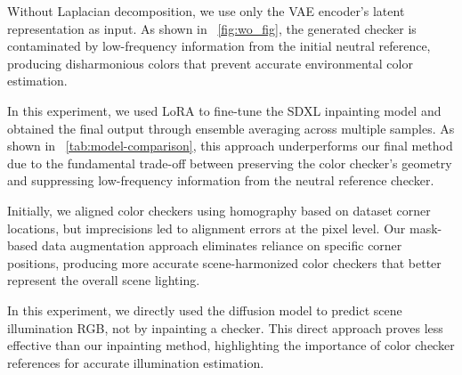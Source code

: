 






% 

\vspace{3pt}  
Without Laplacian decomposition, we use only the VAE encoder's latent representation as input. As shown in ~\cref{fig:wo_fig}, the generated checker is contaminated by low-frequency information from the initial neutral reference, producing disharmonious colors that prevent accurate environmental color estimation.

\vspace{3pt}  
In this experiment, we used LoRA \cite{hu2021lora} to fine-tune the SDXL inpainting model \cite{rombach2021highresolution} and obtained the final output through ensemble averaging across multiple samples. As shown in ~\cref{tab:model-comparison}, this approach underperforms our final method due to the fundamental trade-off between preserving the color checker's geometry and suppressing low-frequency information from the neutral reference checker.

\vspace{3pt}  
Initially, we aligned color checkers using homography based on dataset corner locations, but imprecisions led to alignment errors at the pixel level. Our mask-based data augmentation approach eliminates reliance on specific corner positions, producing more accurate scene-harmonized color checkers that better represent the overall scene lighting.

\vspace{3pt}  
In this experiment, we directly used the diffusion model to predict scene illumination RGB, not by inpainting a checker. This direct approach proves less effective than our inpainting method, highlighting the importance of color checker references for accurate illumination estimation.

